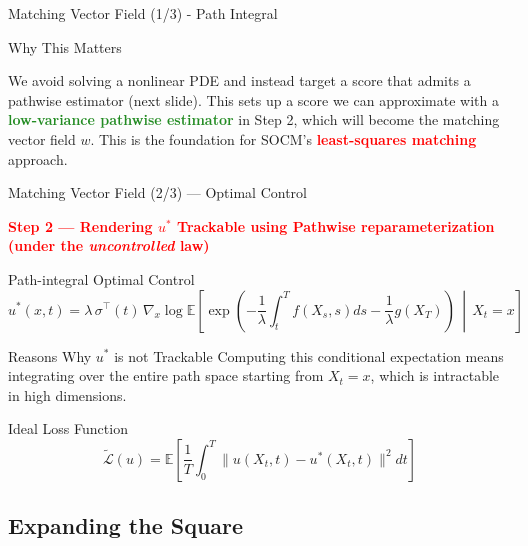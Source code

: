 \documentclass[aspectratio=169,xcolor=dvipsnames]{beamer}
\begin{document}
\begin{frame}[allowframebreaks]{Matching Vector Field (1/3) - Path Integral}
\begin{block}{Why This Matters}
        \vspace{0.3cm}
        
        We avoid solving a nonlinear PDE and instead target a score that admits a pathwise estimator (next slide). This sets up a score we can approximate with a \textcolor{ForestGreen}{\textbf{low-variance pathwise estimator}} in Step 2, which will become the matching vector field $w$. This is the foundation for SOCM's \textcolor{red}{\textbf{least-squares matching}} approach.
    \end{block}
    
    \framebreak
\end{frame}

\begin{frame}[allowframebreaks]{Matching Vector Field (2/3) — Optimal Control}

    \begin{center}
    \Large\textcolor{red}{\textbf{Step 2 — Rendering $u^*$ Trackable using Pathwise reparameterization (under the \emph{uncontrolled} law)}}
    \end{center}

    \begin{alertblock}{Path-integral Optimal Control}
        $$u^*(x,t) = \lambda \, \sigma^\top(t) \, \nabla_x \log \mathbb{E}\left[\exp\left(-\frac{1}{\lambda}\int_t^T f(X_s,s) ds - \frac{1}{\lambda} g(X_T)\right) \,\middle|\, X_t = x\right]$$
    \end{alertblock}

    \begin{block}{Reasons Why $u^*$ is not Trackable}
        Computing this conditional expectation means integrating over the entire path space starting from $X_t = x$, which is intractable in high dimensions.
    \end{block}
    
    \vspace{0.5cm}
    
    \begin{alertblock}{Ideal Loss Function}
        \begin{equation}
        \tilde{\mathcal{L}}(u) = \mathbb{E}\left[\frac{1}{T}\int_0^T \|u(X_t,t) - u^*(X_t,t)\|^2 dt \right]
        \end{equation}
    \end{alertblock}
    
    \vspace{0.8cm}
    
    \subsection*{Expanding the Square}
    

\end{frame}
\end{document}
